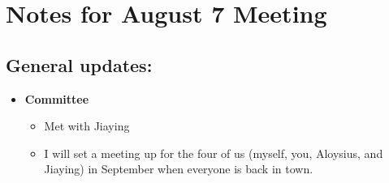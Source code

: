 \documentclass{article}
\begin{document}

\section*{Notes for August 7 Meeting}
\subsection*{General updates:}

\begin{itemize}
\item \textbf{Committee}
\begin{itemize}
\item Met with Jiaying 
\item I will set a meeting up for the four of us (myself, you, Aloysius, and Jiaying) in September when everyone is back in town.
\end{itemize}
\end{itemize}
\end{document}
